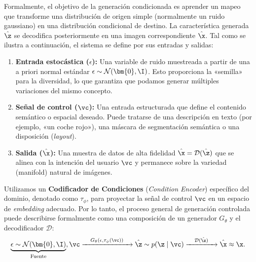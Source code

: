 \documentclass[../../book-main_es.tex]{subfiles}
\begin{document}
Formalmente, el objetivo de la generación condicionada es aprender un mapeo que transforme 
una distribución de origen simple (normalmente un ruido gaussiano) en una distribución condicional de 
destino. La característica generada $\hat{\z}$ se decodifica posteriormente en una imagen correspondiente 
$\hat{\x}$. Tal como se ilustra a continuación, el sistema se define por sus entradas y salidas:
\begin{enumerate}
    \item \textbf{Entrada estocástica ($\epsilon$):} Una variable de ruido muestreada a partir de una 
          a priori normal estándar $\epsilon \sim \mathcal{N}(\bm{0}, \I)$. Esto proporciona 
          la «semilla» para la diversidad, lo que garantiza que podamos generar múltiples variaciones del mismo concepto.
    \item \textbf{Señal de control ($\vc$):} Una entrada estructurada que define el contenido semántico o espacial deseado. 
          Puede tratarse de una descripción en texto (por ejemplo, «un coche rojo»), una máscara de segmentación semántica o una disposición (\textit{layout}).
    \item \textbf{Salida ($\hat{\x}$):} Una muestra de datos de alta fidelidad $\hat{\x} = \mathcal{D}(\hat{\z})$ que se alinea con 
          la intención del usuario $\vc$ y permanece sobre la variedad (manifold) natural de imágenes.
\end{enumerate}
Utilizamos un \textbf{Codificador de Condiciones} (\textit{Condition Encoder}) específico del dominio, denotado como $\tau_\phi$, 
para proyectar la señal de control $\vc$ en un espacio de \textit{embedding} adecuado. Por lo tanto, el proceso 
general de generación controlada puede describirse formalmente como una composición de un generador 
$G_\theta$ y el decodificador $\mathcal{D}$:
\begin{equation}
    \underbrace{\epsilon \sim \mathcal{N}(\bm{0}, \I)}_{\text{Fuente}}, \vc 
    \xrightarrow{\quad G_\theta(\epsilon, \tau_\phi(\vc)) \quad} 
    \hat{\z} \sim p(\z\mid \vc) 
    \xrightarrow{\quad \mathcal{D}(\hat{\z}) \quad} 
    \hat{\x} \approx \x.
\end{equation}
\end{document}
